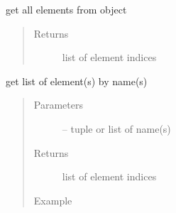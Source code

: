 \documentclass[letterpaper,10pt,english]{sphinxmanual}
\begin{document}
\begin{fulllineitems}

\begin{fulllineitems}
\label{\detokenize{src/apidocs/dakopt:genopt.dakopt.DakotaOC.get_all_elem}}
get all elements from  object
\begin{quote}\begin{description}
\item[{Returns}] \leavevmode
list of element indices

\end{description}\end{quote}

\end{fulllineitems}


\begin{fulllineitems}
\label{\detokenize{src/apidocs/dakopt:genopt.dakopt.DakotaOC.get_elem_by_name}}
get list of element(s) by name(s)
\begin{quote}\begin{description}
\item[{Parameters}] \leavevmode
{} -- tuple or list of name(s)

\item[{Returns}] \leavevmode
list of element indices

\item[{Example}] \leavevmode
\end{description}\end{quote}

\begin{sphinxVerbatim}[commandchars=\\\{\},formatcom=\scriptsize]
  
   
  
\end{sphinxVerbatim}


\end{fulllineitems}
\end{fulllineitems}
\end{document}
